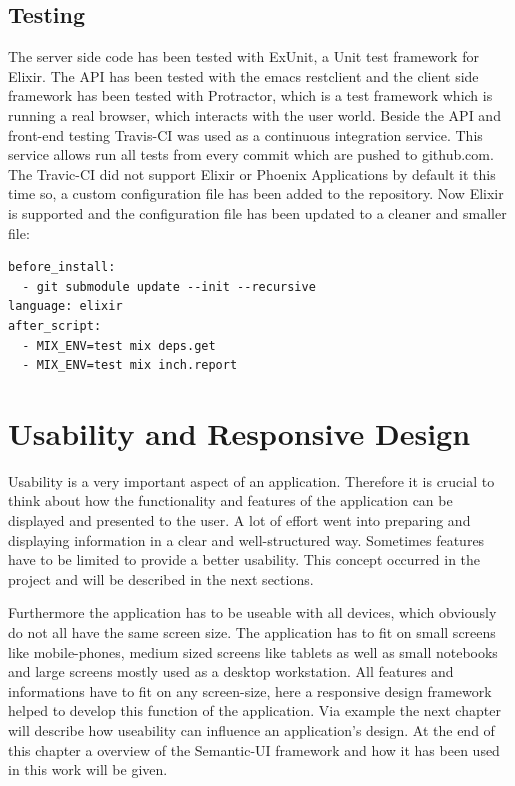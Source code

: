 \section{Testing}
The server side code has been tested with ExUnit, a Unit test framework for Elixir. The API has been tested with the emacs restclient and the client side framework has been tested with Protractor, which is a test framework which is running a real browser, which interacts with the user world.
\textcolor{newcode}{Beside the API and front-end testing Travis-CI was used as a continuous integration service. This service allows run all tests from every commit which are pushed to github.com. The Travic-CI did not support Elixir or Phoenix Applications by default it this time so, a custom configuration file has been added to the repository. Now Elixir is supported and the configuration file has been updated to a cleaner and smaller file:}

\begin{verbatim}
before_install:
  - git submodule update --init --recursive
language: elixir
after_script:
  - MIX_ENV=test mix deps.get
  - MIX_ENV=test mix inch.report
\end{verbatim}

\chapter{Usability and Responsive Design}
Usability is a very important aspect of an application. Therefore it is crucial to think about how the functionality and features of the application can be displayed and presented to the user. A lot of effort went into preparing and displaying information in a clear and well-structured way. Sometimes features have to be limited to provide a better usability. This concept occurred in the project and will be described in the next sections. 

Furthermore the application has to be useable with all devices, which obviously do not all have the same screen size. The application has to fit on small screens like mobile-phones, medium sized screens like tablets as well as small notebooks and large screens mostly used as a desktop workstation. All features and informations have to fit on any screen-size, here a responsive design framework helped to develop this function of the application. Via example the next chapter will describe how useability can influence an application's design. At the end of this chapter a overview of the Semantic-UI framework and how it has been used in this work will be given.

